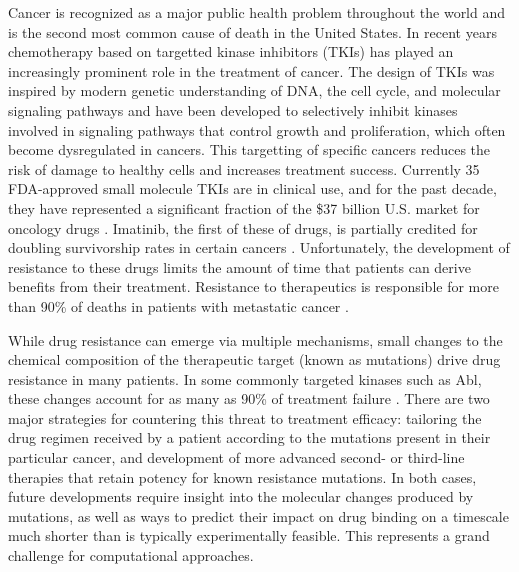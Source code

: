 Cancer is recognized as a major public health problem throughout the world and is the second most common cause of death in the United States.
In recent years chemotherapy based on targetted kinase inhibitors (TKIs) has played an increasingly prominent role in the treatment of cancer.
The design of TKIs was inspired by modern genetic understanding of DNA, the cell cycle, and molecular signaling pathways and have been developed to selectively inhibit kinases involved in signaling pathways that control growth and proliferation, which often become dysregulated in cancers.
This targetting of specific cancers reduces the risk of damage to healthy cells and increases treatment success.
Currently 35 FDA-approved small molecule TKIs are in clinical use, and for the past decade, they have represented a significant fraction of the \$37 billion U.S. market for oncology drugs \cite{FDA, Zhao2014}.
Imatinib, the first of these of drugs, is partially credited for doubling survivorship rates in certain cancers \cite{Zhao2014, ACSreport}.
Unfortunately, the development of resistance to these drugs limits the amount of time that patients can derive benefits from their treatment. 
Resistance to therapeutics is responsible for more than 90\% of deaths in patients with metastatic cancer \cite{Longley2005}.

While drug resistance can emerge via multiple mechanisms, small changes to the chemical composition of the therapeutic target (known as mutations) drive drug resistance in many patients.
In some commonly targeted kinases such as Abl, these changes account for as many as 90\% of treatment failure \cite{Shah2002}.
There are two major strategies for countering this threat to treatment efficacy: tailoring the drug regimen received by a patient according to the mutations present in their particular cancer, and development of more advanced second- or third-line therapies that retain potency for known resistance mutations.
In both cases, future developments require insight into the molecular changes produced by mutations, as well as ways to predict their impact on drug binding on a timescale much shorter than is typically experimentally feasible.
This represents a grand challenge for computational approaches.

